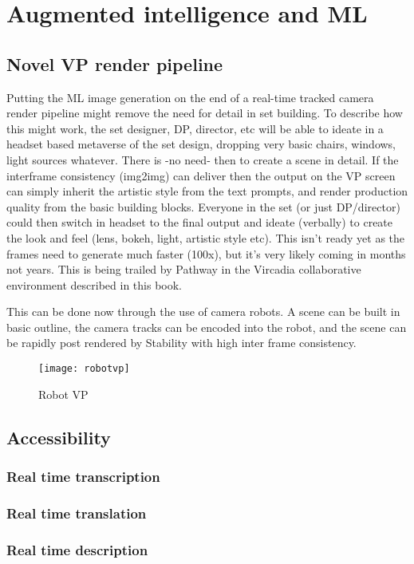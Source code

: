 \section{Augmented intelligence and ML}
\subsection{Novel VP render pipeline}
Putting the ML image generation on the end of a real-time tracked camera render pipeline might remove the need for detail in set building. To describe how this might work, the set designer, DP, director, etc will be able to ideate in a headset based metaverse of the set design, dropping very basic chairs, windows, light sources whatever. There is -no need- then to create a scene in detail. If the interframe consistency (img2img) can deliver then the output on the VP screen can simply inherit the artistic style from the text prompts, and render production quality from the basic building blocks. Everyone in the set (or just DP/director) could then switch in headset to the final output and ideate (verbally) to create the look and feel (lens, bokeh, light, artistic style etc). This isn’t ready yet as the frames need to generate much faster (100x), but it’s very likely coming in months not years. This is being trailed by Pathway in the Vircadia collaborative environment described in this book.\par
This can be done now through the use of camera robots. A scene can be built in basic outline, the camera tracks can be encoded into the robot, and the scene can be rapidly post rendered by Stability with high inter frame consistency.
\begin{figure}[ht]\centering 	\texttt{[image: robotvp]}
	\caption{Robot VP}
	\label{fig:robotvp}
\end{figure}
\subsection{Accessibility}
\subsubsection{Real time transcription}
\subsubsection{Real time translation}
\subsubsection{Real time description}
